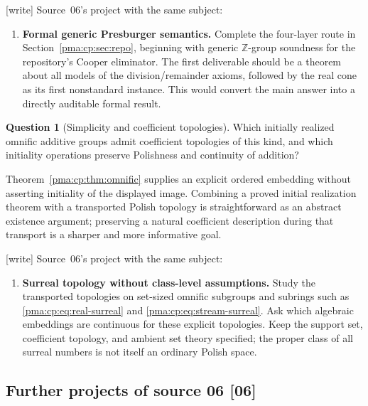 \documentclass[11pt]{article}
\numberwithin{equation}{section}
\theoremstyle{definition}
\newtheorem{question}[question]{Question}
\theoremstyle{remark}
\newcommand{\Z}{\mathbb Z}
\newcommand{\src}[1]{\textup{\textsf{\small[#1]}}}
\newcommand{\writetag}{\textup{\textsf{\small[write]}}}
\begin{document}
\noindent\writetag{} Source~06's project with the same subject:

\begin{enumerate}[label=\textbf{\arabic*.},leftmargin=*,start=1]

\item \textbf{Formal generic Presburger semantics.}
Complete the four-layer route in Section~\ref{pma:cp:sec:repo}, beginning
with generic $\Z$-group soundness for the repository's Cooper
eliminator. The first deliverable should be a theorem about all
models of the division/remainder axioms, followed by the real
cone as its first nonstandard instance. This would convert the
main answer into a directly auditable formal result.

\end{enumerate}

\begin{question}[Simplicity and coefficient topologies]
Which initially realized omnific additive groups admit coefficient
topologies of this kind, and which initiality operations preserve
Polishness and continuity of addition?
\end{question}
Theorem~\ref{pma:cp:thm:omnific} supplies an explicit ordered embedding without
asserting initiality of the displayed image. Combining a proved initial
realization theorem with a transported Polish topology is straightforward
as an abstract existence argument; preserving a natural coefficient
description during that transport is a sharper and more informative goal.

\noindent\writetag{} Source~06's project with the same subject:

\begin{enumerate}[label=\textbf{\arabic*.},leftmargin=*,start=12]

\item \textbf{Surreal topology without class-level assumptions.}
Study the transported topologies on set-sized omnific subgroups
and subrings such as \eqref{pma:cp:eq:real-surreal} and
\eqref{pma:cp:eq:stream-surreal}. Ask which algebraic embeddings are
continuous for these explicit topologies. Keep the support set,
coefficient topology, and ambient set theory specified; the
proper class of all surreal numbers is not itself an ordinary
Polish space.

\end{enumerate}

\subsection{Further projects of source 06 \src{06}}\label{pma:cp:sec:future}
\end{document}
